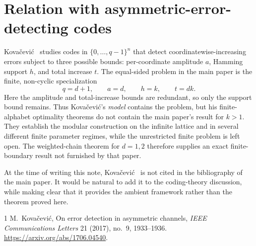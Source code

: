 \documentclass[11pt]{article}
\theoremstyle{definition}
\begin{document}
\section{Relation with asymmetric-error-detecting codes}

Kova\v{c}evi\'c~\cite{kovacevic} studies codes in
$\{0,\ldots,q-1\}^n$ that detect coordinatewise-increasing errors subject
to three possible bounds: per-coordinate amplitude $a$, Hamming support
$h$, and total increase $t$.  The equal-sided problem in the main paper is
the finite, non-cyclic specialization
\[
  q=d+1,\qquad a=d,\qquad h=k,\qquad t=dk.
\]
Here the amplitude and total-increase bounds are redundant, so only the
support bound remains.  Thus Kova\v{c}evi\'c's \emph{model} contains the
problem, but his finite-alphabet optimality theorems do not contain the main
paper's result for $k>1$.  They establish the modular construction on the
infinite lattice and in several different finite parameter regimes, while
the unrestricted finite problem is left open.  The weighted-chain theorem
for $d=1,2$ therefore supplies an exact finite-boundary result not furnished
by that paper.

At the time of writing this note, Kova\v{c}evi\'c~\cite{kovacevic} is not
cited in the bibliography of the main paper.  It would be natural to add it
to the coding-theory discussion, while making clear that it provides the
ambient framework rather than the theorem proved here.

\begin{thebibliography}{1}
M.~Kova\v{c}evi\'c,
\newblock On error detection in asymmetric channels,
\newblock \emph{IEEE Communications Letters} 21 (2017), no.~9, 1933--1936.
\newblock \url{https://arxiv.org/abs/1706.04540}.
\end{thebibliography}
\end{document}
